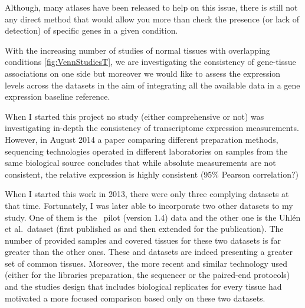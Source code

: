 Although, many atlases have been released to help on this issue,
there is still not any direct method that would allow you more than check the
presence (or lack of detection) of specific genes in a given condition.

With the increasing number of studies of normal tissues with overlapping conditions
\cref{fig:VennStudiesT}, we are investigating the consistency of gene-tissue
associations on one side but moreover we would like to assess the expression
levels across the datasets in the aim of integrating all the available data in a
gene expression baseline reference.

When I started this project no study (either comprehensive or not) was
investigating in-depth the consistency of transcriptome expression measurements.
However, in August 2014 a paper comparing different preparation methods,
sequencing technologies operated in different laboratories
on samples from the same biological source concludes that while absolute
measurements are not consistent, the relative expression is highly consistent
(95\% Pearson correlation?)

\begin{comment}
The main question when I started this project was to appraise how much consistent
(robust) is the \Rnaseq\ technology to quantify the gene expression. While it
is comparable to microarrays for differential gene expression analysis study
\TK{add reference},
\Rnaseq\ plus: detect new things - minus: sampling problems (stuff might be there
but won't be ``fished''.
\end{comment}

When I started this work in 2013, there were only three complying
datasets at that time. Fortunately, I was later
able to incorporate two other datasets to my study. One of them is the \Gtex\
pilot (version 1.4) data and the other one is the Uhlén et al.\ dataset (first
published as \citet{Uhlen2014} and then extended for the \citet{Uhlen2015} publication).
The number of provided samples and covered tissues for these two datasets
is far greater than the other ones. These \dataset{\Gtex} and 
datasets are indeed presenting a greater set of common tissues. Moreover,
the more recent and similar technology used (either for the libraries preparation,
the sequencer or the paired-end protocols) and the studies design that includes
biological replicates for every tissue had motivated a more focused comparison
based only on these two datasets.

